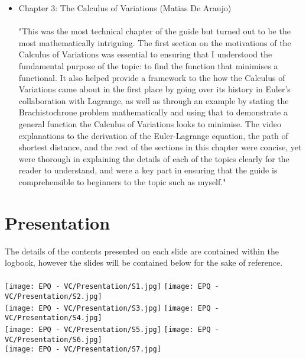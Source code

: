 \documentclass[12pt]{report}
\begin{document}
\begin{itemize}
    \\
    \\
    \item Chapter 3: The Calculus of Variations (Matias De Araujo)
    \\
    \\
    "This was the most technical chapter of the guide but turned out to be the most mathematically intriguing. The first section on the motivations of the Calculus of Variations was essential to ensuring that I understood the fundamental purpose of the topic: to find the function that minimises a functional. It also helped provide a framework to the how the Calculus of Variations came about in the first place by going over its history in Euler's collaboration with Lagrange, as well as through an example by stating the Brachistochrone problem mathematically and using that to demonstrate a general function the Calculus of Variations looks to minimise. The video explanations to the derivation of the Euler-Lagrange equation, the path of shortest distance, and the rest of the sections in this chapter were concise, yet were thorough in explaining the details of each of the topics clearly for the reader to understand, and were a key part in ensuring that the guide is comprehensible to beginners to the topic such as myself." 
\end{itemize}

\chapter{Presentation}

The details of the contents presented on each slide are contained within the logbook, however the slides will be contained below for the sake of reference.
\\
\\
\texttt{[image: EPQ - VC/Presentation/S1.jpg]}
\texttt{[image: EPQ - VC/Presentation/S2.jpg]} 
\\
\texttt{[image: EPQ - VC/Presentation/S3.jpg]} 
\texttt{[image: EPQ - VC/Presentation/S4.jpg]} 
\\
\texttt{[image: EPQ - VC/Presentation/S5.jpg]} 
\texttt{[image: EPQ - VC/Presentation/S6.jpg]} 
\\
\texttt{[image: EPQ - VC/Presentation/S7.jpg]} 
\end{document}
